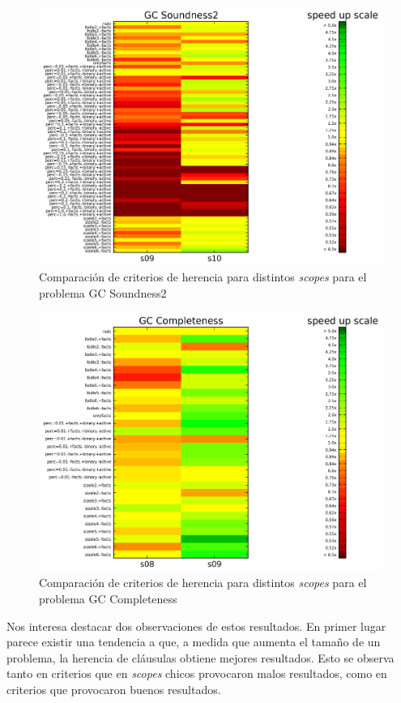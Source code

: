 \begin{figure}
	\includegraphics[width=\textwidth]{resultados/lossound_heat.png}
	\caption{Comparación de criterios de herencia para distintos \emph{scopes} para el problema GC Soundness2}
	\label{res:learnscopessoundness}
\end{figure}

\begin{figure}
	\includegraphics[width=\textwidth]{resultados/loscomp_heat.png}
	\caption{Comparación de criterios de herencia para distintos \emph{scopes} para el problema GC Completeness}
	\label{res:learnscopescompleteness}
\end{figure}

Nos interesa destacar dos observaciones de estos resultados. En primer lugar
parece existir una tendencia a que, a medida que aumenta el tamaño de un
problema, la herencia de cláusulas obtiene mejores resultados. Esto se observa
tanto en criterios que en \emph{scopes} chicos provocaron malos resultados,
como en criterios que provocaron buenos resultados.

